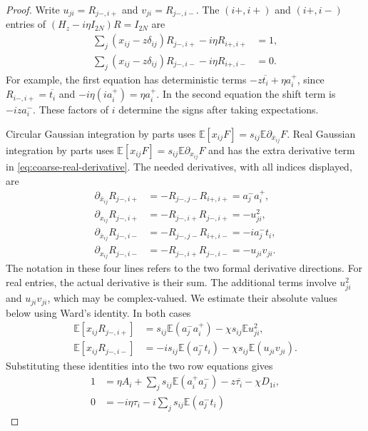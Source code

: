 \documentclass[11pt,reqno]{amsart}
\numberwithin{equation}{section}
\theoremstyle{plain}
\theoremstyle{definition}
\theoremstyle{remark}
\begin{document}
\begin{proof}
Write $u_{ji}=R_{j-,i+}$ and $v_{ji}=R_{j-,i-}$.  The $(i+,i+)$ and
$(i+,i-)$ entries of $(H_z-i\eta I_{2N})R=I_{2N}$ are
\begin{align}
 \sum_j(x_{ij}-z\delta_{ij})R_{j-,i+}-i\eta R_{i+,i+}&=1,
 \label{eq:coarse-raw-diagonal}\\
 \sum_j(x_{ij}-z\delta_{ij})R_{j-,i-}-i\eta R_{i+,i-}&=0.
 \label{eq:coarse-raw-offdiagonal}
\end{align}
For example, the first equation has deterministic terms
$-z\overline{t_i}+\eta a_i^+$, since
$R_{i-,i+}=\overline{t_i}$ and $-i\eta(ia_i^+)=\eta a_i^+$.
In the second equation the shift term is $-iz a_i^-$.
These factors of $i$ determine the signs after taking expectations.

Circular Gaussian integration by parts uses
$\mathbb E[x_{ij}F]=s_{ij}\mathbb E\partial_{\overline{x}_{ij}}F$.
Real Gaussian integration by parts uses
$\mathbb E[x_{ij}F]=s_{ij}\mathbb E\partial_{x_{ij}}F$ and has the extra
derivative term in \eqref{eq:coarse-real-derivative}.  The needed derivatives, with all indices displayed, are
\begin{align*}
 \partial_{\overline{x}_{ij}}R_{j-,i+}
 &=-R_{j-,j-}R_{i+,i+}=a_j^-a_i^+,\\
 \partial_{x_{ij}}R_{j-,i+}
 &=-R_{j-,i+}R_{j-,i+}=-u_{ji}^2,\\
 \partial_{\overline{x}_{ij}}R_{j-,i-}
 &=-R_{j-,j-}R_{i+,i-}=-ia_j^-t_i,\\
 \partial_{x_{ij}}R_{j-,i-}
 &=-R_{j-,i+}R_{j-,i-}=-u_{ji}v_{ji}.
\end{align*}
The notation in these four lines refers to the two formal derivative
directions. For real entries, the actual derivative is their sum.
The additional terms involve $u_{ji}^2$ and $u_{ji}v_{ji}$, which may
be complex-valued. We estimate their absolute values below using Ward's
identity. In both cases
\begin{align*}
 \mathbb E[x_{ij}R_{j-,i+}]
 &=s_{ij}\mathbb E(a_j^-a_i^+)
   -\chi s_{ij}\mathbb E u_{ji}^{2},\\
 \mathbb E[x_{ij}R_{j-,i-}]
 &=-is_{ij}\mathbb E(a_j^-t_i)
   -\chi s_{ij}\mathbb E(u_{ji}v_{ji}).
\end{align*}
Substituting these identities into the two row equations gives
\begin{align*}
 1&=\eta A_i+\sum_j s_{ij}\mathbb E(a_i^+a_j^-)
       -z\overline{\tau_i}-\chi D_{1i},\\
 0&=-i\eta\tau_i-i\sum_j s_{ij}\mathbb E(a_j^-t_i)

\end{align*}
\end{proof}
\end{document}

